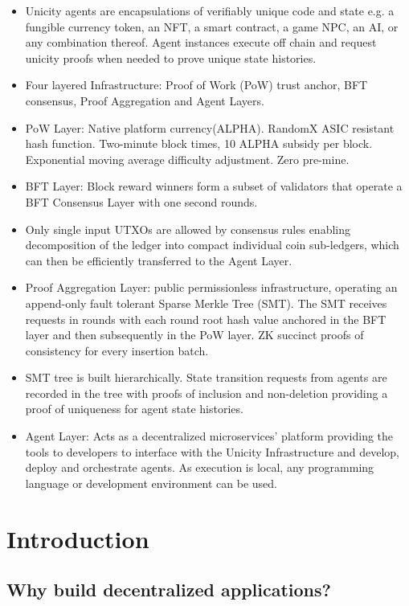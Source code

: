 \documentclass{article}
\begin{document}
\begin{itemize}
    \item Unicity agents are encapsulations of verifiably unique code and state e.g. a fungible currency token, an NFT, a smart contract,  a game NPC, an AI, or any combination thereof. Agent instances execute off chain and request unicity proofs when needed to prove unique state histories.
    \item  Four layered Infrastructure: Proof of Work (PoW) trust anchor, BFT consensus, Proof Aggregation and Agent Layers.
    \item PoW Layer: Native platform currency(ALPHA). RandomX ASIC resistant hash function. Two-minute block times, 10 ALPHA subsidy per block. Exponential moving average difficulty adjustment. Zero pre-mine.
    \item BFT Layer: Block reward winners form a subset of validators that operate a BFT Consensus Layer with one second rounds.
    \item Only single input UTXOs are allowed by consensus rules enabling decomposition of the ledger into compact individual coin sub-ledgers, which can then be efficiently transferred to the Agent Layer.
    \item Proof Aggregation Layer: public permissionless infrastructure, operating an append-only fault tolerant Sparse Merkle Tree (SMT). The SMT receives requests in rounds with each round root hash value anchored in the BFT layer and then subsequently in the PoW layer. ZK succinct proofs of consistency for every insertion batch.
    \item SMT tree is built hierarchically. State transition requests from agents are recorded in the tree with proofs of inclusion and non-deletion providing a proof of uniqueness for agent state histories.
    \item Agent Layer: Acts as a decentralized microservices' platform providing the tools to developers to interface with the Unicity Infrastructure and develop, deploy and orchestrate agents. As execution is local, any programming language or development environment can be used.
\end{itemize}


\section{Introduction}

\subsection{Why build decentralized applications?}
\end{document}
